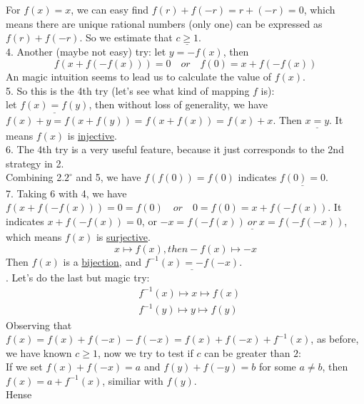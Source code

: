 \documentclass{Math_Note}
\begin{document}
\begin{sol}
For $f(x)=x$, we can easy find $f(r)+f(-r)=r+(-r)=0$, which means there are unique rational numbers (only one) can be expressed as $f(r)+f(-r)$. So we estimate that $\underline{c\geq 1}$. \\
4. Another (maybe not easy) try: let $y=-f(x)$, then 
\begin{equation}
    f(x+f(-f(x)))=0 \quad or \quad f(0)=x+f(-f(x))
\end{equation}
An magic intuition seems to lead us to calculate the value of $f(x)$. \\
5. So this is the 4th try (let's see what kind of mapping $f$ is): \\
let $\underline{f(x)=f(y)}$, then without loss of generality, we have $f(x)+y=f(x+f(y))=f(x+f(x))=f(x)+x$. Then $\underline{x=y}$. It means $f(x)$ is \underline{injective}.\\
6. The 4th try is a very useful feature, because it just corresponds to the 2nd strategy in 2. \\
Combining 2.$2^{\circ}$ and 5, we have $f(f(0))=f(0)$ indicates $\underline{f(0)=0}$. \\
7. Taking 6 with 4, we have $f(x+f(-f(x)))=0=f(0) \quad or \quad 0=f(0)=x+f(-f(x))$. It indicates $x+f(-f(x))=0$, or $\underline{-x=f(-f(x))\ or\ x=f(-f(-x))}$, which means $f(x)$ is \underline{surjective}. \\
\begin{equation}
    x \mapsto f(x), then -f(x) \mapsto -x
\end{equation}
Then $f(x)$ is a \underline{bijection}, and $\underline{f^{-1}(x)=-f(-x)}$. \\
. Let's do the last but magic try: 
\begin{equation}
    \begin{split}
        & f^{-1}(x) \mapsto x \mapsto f(x) \\
        & f^{-1}(y) \mapsto y \mapsto f(y)
    \end{split}
\end{equation}
Observing that $f(x)=f(x)+f(-x)-f(-x)=f(x)+f(-x)+f^{-1}(x)$, as before, we have known $c\geq 1$, now we try to test if $c$ can be greater than $2$: \\
\newline
If we set $f(x)+f(-x)=a$ and $f(y)+f(-y)=b$ for some $a\neq b$, then $f(x)=a+f^{-1}(x)$, similiar with $f(y)$. \\
Hense 
\begin{equation}
    \begin{split}

\end{split}
\end{equation}
\end{sol}
\end{document}
